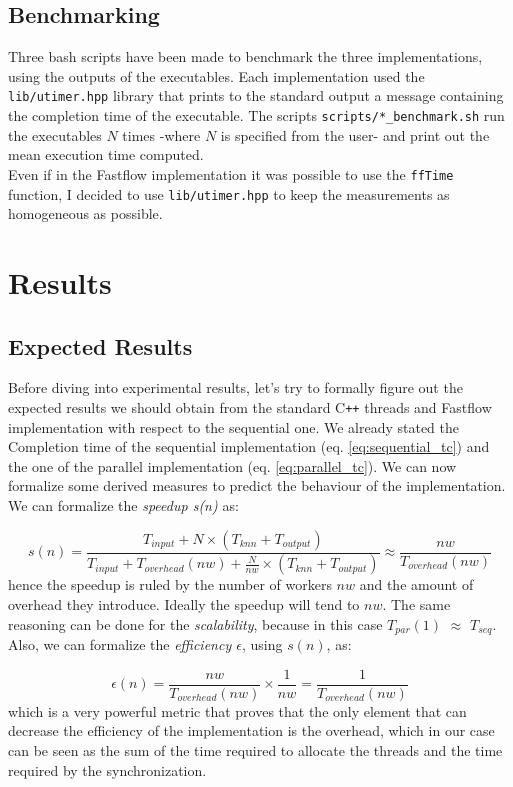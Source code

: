 \documentclass[12pt, letterpaper]{article}  %
\begin{document}
\subsection{Benchmarking}
Three bash scripts have been made to benchmark the three implementations, using the outputs of the executables. Each implementation used the \texttt{lib/utimer.hpp} library that prints to the standard output a message containing the completion time of the executable. The scripts \texttt{scripts/*\_benchmark.sh} run the executables $N$ times -where $N$ is specified from the user- and print out the mean execution time computed.\\
Even if in the Fastflow implementation it was possible to use the \texttt{ffTime} function, I decided to use \texttt{lib/utimer.hpp} to keep the measurements as homogeneous as possible.

\section{Results}
\subsection{Expected Results}
Before diving into experimental results, let's try to formally figure out the expected results we should obtain from the standard C\verb!++! threads and Fastflow implementation with respect to the sequential one.
We already stated the Completion time of the sequential implementation (eq. \ref{eq:sequential_tc}) and the one of the parallel implementation (eq. \ref{eq:parallel_tc}). We can now formalize some derived measures to predict the behaviour of the implementation.
We can formalize the \textit{speedup s(n)} as:

\begin{equation}
    \textit{$s(n)$} = \textit{$\frac{T_{input} + N \times (T_{knn} + T_{output})}{T_{input} + T_{overhead}(nw) + \frac{N}{nw} \times (T_{knn} + T_{output})} \approx \frac{nw}{T_{overhead}(nw)}$}
    \label{eq:speedup}
\end{equation} 
hence the speedup is ruled by the number of workers $nw$ and the amount of overhead they introduce. Ideally the speedup will tend to $nw$. The same reasoning can be done for the \textit{scalability}, because in this case \textit{$T_{par}(1)$} $\approx$ \textit{$T_{seq}$}.\\
Also, we can formalize the \textit{efficiency $\epsilon$}, using \textit{$s(n)$}, as:

\begin{equation}
    \textit{$\epsilon(n)$} = \textit{$\frac{nw}{T_{overhead}(nw)} \times \frac{1}{nw} = \frac{1}{T_{overhead}(nw)}$}
    \label{eq:efficiency}
\end{equation}
which is a very powerful metric that proves that the only element that can decrease the efficiency of the implementation is the overhead, which in our case can be seen as the sum of the time required to allocate the threads and the time required by the synchronization.
\end{document}
